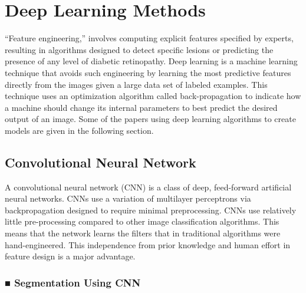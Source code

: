 \documentclass[12pt]{report}
\begin{document}
\section{Deep Learning Methods}
“Feature engineering,” involves computing explicit features specified by experts, resulting in algorithms designed to detect specific lesions or predicting the presence of any level of diabetic retinopathy. Deep learning is a machine learning technique that avoids such engineering by learning the most predictive features directly from the images given a large data set of labeled examples. This technique uses an optimization algorithm called back-propagation to indicate how a machine should change its internal parameters to best predict the desired output of an image. Some of the papers using deep learning algorithms to create models are given in the following section.

\subsection{Convolutional Neural Network}


A convolutional neural network (CNN) is a class of deep, feed-forward artificial neural networks. CNNs use a variation of multilayer perceptrons via backpropagation designed to require minimal preprocessing. CNNs use relatively little pre-processing compared to other image classification algorithms. This means that the network learns the filters that in traditional algorithms were hand-engineered. This independence from prior knowledge and human effort in feature design is a major advantage.




\subsubsection{■ Segmentation Using CNN}
\end{document}
